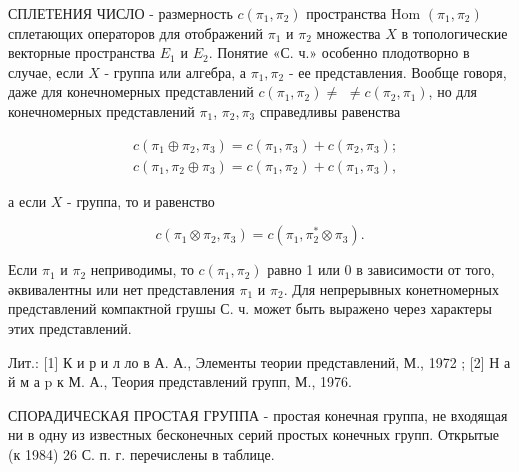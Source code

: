 \documentclass[10pt]{article}
\begin{document}
СПЛЕТЕНИЯ ЧИСЛО - размерность $c\left(\pi_{1}, \pi_{2}\right)$ пространства Hom $\left(\pi_{1}, \pi_{2}\right)$ сплетающих операторов для отображений $\pi_{1}$ и $\pi_{2}$ множества $X$ в топологические векторные пространства $E_{1}$ и $E_{2}$. Понятие «С. ч.» особенно плодотворно в случае, если $X$ - группа или алгебра, а $\pi_{1}, \pi_{2}$ - ее представления. Вообще говоря, даже для конечномерных представлений $c\left(\pi_{1}, \pi_{2}\right) \neq$ $\neq c\left(\pi_{2}, \pi_{1}\right)$, но для конечномерных представлений $\pi_{1}$, $\pi_{2}, \pi_{3}$ справедливы равенства



\[

\begin{aligned}

& c\left(\pi_{1} \oplus \pi_{2}, \pi_{3}\right)=c\left(\pi_{1}, \pi_{3}\right)+c\left(\pi_{2}, \pi_{3}\right) ; \\

& c\left(\pi_{1}, \pi_{2} \oplus \pi_{3}\right)=c\left(\pi_{1}, \pi_{2}\right)+c\left(\pi_{1}, \pi_{3}\right),

\end{aligned}

\]



а если $X$ - группа, то и равенство



\[

c\left(\pi_{1} \otimes \pi_{2}, \pi_{3}\right)=c\left(\pi_{1}, \pi_{2}^{*} \otimes \pi_{3}\right) .

\]



Если $\pi_{1}$ и $\pi_{2}$ неприводимы, то $c\left(\pi_{1}, \pi_{2}\right)$ равно 1 или 0 в зависимости от того, әквивалентны или нет представления $\pi_{1}$ и $\pi_{2}$. Для непрерывных конетномерных представлений компактной грушы С. ч. может быть выражено через характеры этих представлений.



Лит.: [1] К и р и л ло в А. А., Элементы теории представлений, М., 1972 ; [2] Н а й м а p к М. А., Теория представлений групп, М., 1976.



СПОРАДИЧЕСКАЯ ПРОСТАЯ ГРУППА - простая конечная группа, не входящая ни в одну из известных бесконечных серий простых конечных групп. Открытые (к 1984) 26 С. п. г. перечислены в таблице.
\end{document}
